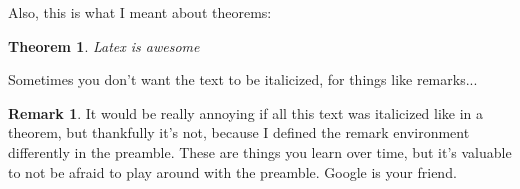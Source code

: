 \documentclass[11pt,reqno]{amsart}
\newtheorem{theorem}[subsection]{Theorem}
\theoremstyle{definition}
\newtheorem{remark}[subsection]{Remark}
\numberwithin{equation}{subsection}
\begin{document}
Also, this is what I meant about theorems:

\begin{theorem}
Latex is awesome
\end{theorem}

Sometimes you don't want the text to be italicized, for things like remarks...

\begin{remark}
It would be really annoying if all this text was italicized like in a theorem, but thankfully it's not, because I defined the remark environment differently in the preamble. These are things you learn over time, but it's valuable to not be afraid to play around with the preamble. Google is your friend.
\end{remark}

\end{document}
